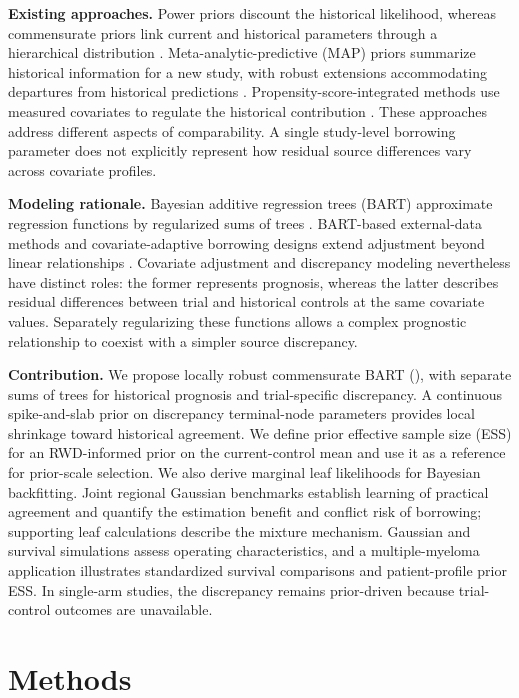\documentclass[11pt]{article}
\begin{document}
\noindent\textbf{Existing approaches.}
Power priors discount the historical likelihood, whereas commensurate priors link current and historical parameters through a hierarchical distribution \citep{IbrahimChen2000,Hobbs2011,Hobbs2012}. Meta-analytic-predictive (MAP) priors summarize historical information for a new study, with robust extensions accommodating departures from historical predictions \citep{Neuenschwander2010MAP,Schmidli2014MAP}. Propensity-score-integrated methods use measured covariates to regulate the historical contribution \citep{Chen2020PSCL}. These approaches address different aspects of comparability. A single study-level borrowing parameter does not explicitly represent how residual source differences vary across covariate profiles.

\noindent\textbf{Modeling rationale.}
Bayesian additive regression trees (BART) approximate regression functions by regularized sums of trees \citep{Chipman2010BART}. BART-based external-data methods and covariate-adaptive borrowing designs extend adjustment beyond linear relationships \citep{ZhouJi2021,Jin2023CAHB}. Covariate adjustment and discrepancy modeling nevertheless have distinct roles: the former represents prognosis, whereas the latter describes residual differences between trial and historical controls at the same covariate values. Separately regularizing these functions allows a complex prognostic relationship to coexist with a simpler source discrepancy.

\noindent\textbf{Contribution.}
We propose locally robust commensurate BART (\lrc{}), with separate sums of trees for historical prognosis and trial-specific discrepancy. A continuous spike-and-slab prior on discrepancy terminal-node parameters provides local shrinkage toward historical agreement. We define prior effective sample size (ESS) for an RWD-informed prior on the current-control mean and use it as a reference for prior-scale selection. We also derive marginal leaf likelihoods for Bayesian backfitting. Joint regional Gaussian benchmarks establish learning of practical agreement and quantify the estimation benefit and conflict risk of borrowing; supporting leaf calculations describe the mixture mechanism. Gaussian and survival simulations assess operating characteristics, and a multiple-myeloma application illustrates standardized survival comparisons and patient-profile prior ESS. In single-arm studies, the discrepancy remains prior-driven because trial-control outcomes are unavailable.

\section{Methods}
\end{document}
